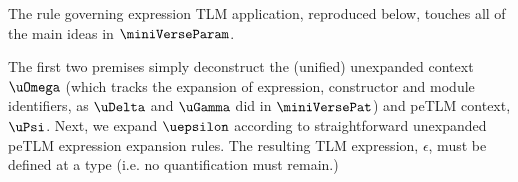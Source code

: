 \documentclass[acmsmall,10pt,review,anonymous]{acmart}\settopmatter{printfolios=true}
\begin{document}
The rule governing expression TLM application, reproduced below, touches all of the main ideas in $\miniVerseParam$. %
\begin{mathpar}
\end{mathpar}
The first two premises simply deconstruct the (unified) unexpanded context $\uOmega$ (which tracks the expansion of expression, constructor and module identifiers, as $\uDelta$ and $\uGamma$ did in $\miniVersePat$) and peTLM context, $\uPsi$. Next, we expand $\uepsilon$ according to straightforward unexpanded peTLM expression expansion rules. The resulting TLM expression, $\epsilon$, must be defined at a type (i.e. no quantification must remain.)
\end{document}
